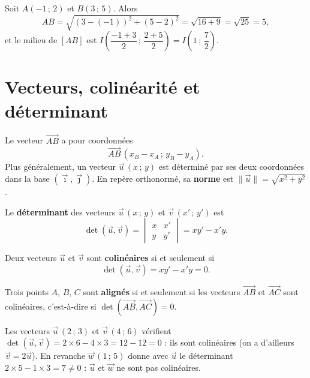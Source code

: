 \begin{exemple}
Soit $A(-1\,;\,2)$ et $B(3\,;\,5)$. Alors
\[ AB=\sqrt{(3-(-1))^2+(5-2)^2}=\sqrt{16+9}=\sqrt{25}=5, \]
et le milieu de $[AB]$ est $I\!\left(\dfrac{-1+3}{2}\,;\,\dfrac{2+5}{2}\right)=I\!\left(1\,;\,\dfrac{7}{2}\right)$.
\end{exemple}

\section{Vecteurs, colinéarité et déterminant}

\begin{definition}
Le vecteur $\overrightarrow{AB}$ a pour coordonnées
\[ \overrightarrow{AB}\,(x_B-x_A\,;\,y_B-y_A). \]
Plus généralement, un vecteur $\vec{u}\,(x\,;\,y)$ est déterminé par ses deux
coordonnées dans la base $(\vec{\imath},\vec{\jmath})$. En repère orthonormé, sa
\textbf{norme} est $\|\vec{u}\|=\sqrt{x^2+y^2}$.
\end{definition}

\begin{definition}
Le \textbf{déterminant} des vecteurs $\vec{u}\,(x\,;\,y)$ et $\vec{v}\,(x'\,;\,y')$ est
\[ \det(\vec{u},\vec{v})=\begin{vmatrix} x & x' \\ y & y' \end{vmatrix}=xy'-x'y. \]
\end{definition}

\begin{theoreme}
Deux vecteurs $\vec{u}$ et $\vec{v}$ sont \textbf{colinéaires} si et seulement si
\[ \det(\vec{u},\vec{v})=xy'-x'y=0. \]
\end{theoreme}

\begin{remarque}
Trois points $A$, $B$, $C$ sont \textbf{alignés} si et seulement si les vecteurs
$\overrightarrow{AB}$ et $\overrightarrow{AC}$ sont colinéaires, c'est-à-dire si
$\det(\overrightarrow{AB},\overrightarrow{AC})=0$.
\end{remarque}

\begin{exemple}
Les vecteurs $\vec{u}\,(2\,;\,3)$ et $\vec{v}\,(4\,;\,6)$ vérifient
$\det(\vec{u},\vec{v})=2\times 6-4\times 3=12-12=0$ : ils sont colinéaires (on a
d'ailleurs $\vec{v}=2\vec{u}$). En revanche $\vec{w}\,(1\,;\,5)$ donne avec $\vec{u}$
le déterminant $2\times 5-1\times 3=7\neq 0$ : $\vec{u}$ et $\vec{w}$ ne sont pas
colinéaires.
\end{exemple}

